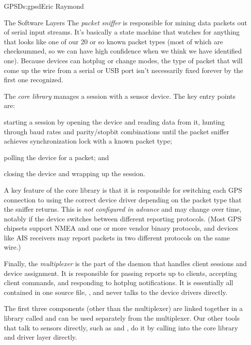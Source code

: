 \begin{aosachapter}{GPSD}{s:gpsd}{Eric Raymond}
\begin{aosasect1}{The Software Layers}
The \emph{packet sniffer} is responsible for mining data packets out
of serial input streams.  It's basically a state machine that watches
for anything that looks like one of our 20 or so known packet types
(most of which are checksummed, so we can have high confidence when we
think we have identified one).  Because devices can hotplug or change
modes, the type of packet that will come up the wire from a serial or
USB port isn't necessarily fixed forever by the first one recognized.

The \emph{core library} manages a session with a sensor device.  The
key entry points are:

\begin{aosaitemize}

  \item starting a session by opening the device and reading data from
    it, hunting through baud rates and parity/stopbit combinations
    until the packet sniffer achieves synchronization lock with a
    known packet type;

  \item polling the device for a packet; and

  \item closing the device and wrapping up the session.

\end{aosaitemize}

A key feature of the core library is that it is responsible for
switching each GPS connection to using the correct device driver
depending on the packet type that the sniffer returns.  This is
\emph{not configured in advance} and may change over time, notably if
the device switches between different reporting protocols.  (Most GPS
chipsets support NMEA and one or more vendor binary protocols, and
devices like AIS receivers may report packets in two different
protocols on the same wire.)

Finally, the \emph{multiplexer} is the part of the daemon that handles
client sessions and device assignment.  It is responsible for passing
reports up to clients, accepting client commands, and responding to
hotplug notifications. It is essentially all contained in one source
file, , and never talks to the device drivers directly.

The first three components (other than the multiplexer) are linked
together in a library called  and can be used separately
from the multiplexer. Our other tools that talk to sensors directly,
such as  and , do it by calling into the
core library and driver layer directly.


\end{aosasect1}
\end{aosachapter}
